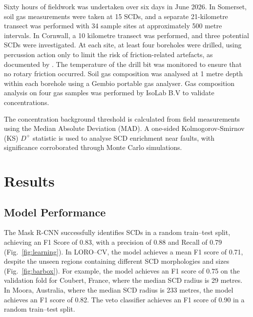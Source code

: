 \documentclass[12pt]{article}
\begin{document}
Sixty hours of fieldwork was undertaken over six days in June 2026. In Somerset, soil gas measurements were taken at 15 SCDs, and a separate 21-kilometre transect was performed with 34 sample sites at approximately 500 metre intervals. In Cornwall, a 10 kilometre transect was performed, and three potential SCDs were investigated. At each site, at least four boreholes were drilled, using percussion action only to limit the risk of friction-related  artefacts, as documented by \textcite{H2Artefacts}. The temperature of the drill bit was monitored to ensure that no rotary friction occurred. Soil gas composition was analysed at 1 metre depth within each borehole using a Gembio portable gas analyser. Gas composition analysis on four gas samples was performed by IsoLab B.V to validate  concentrations.

The  concentration background threshold is calculated from field measurements using the Median Absolute Deviation (MAD). A one-sided Kolmogorov-Smirnov (KS) $D^+$ statistic is used to analyse SCD enrichment near faults, with significance corroborated through Monte Carlo simulations. 

\section{Results}

\subsection{Model Performance}

The Mask R-CNN successfully identifies SCDs in a random train--test split, achieving an F1 Score of 0.83, with a precision of 0.88 and Recall of 0.79 (Fig.~\ref{fig:learning}). In LORO--CV, the model achieves a mean F1 score of 0.71, despite the unseen regions containing different SCD morphologies and sizes (Fig.~\ref{fig:barbox}). For example, the model achieves an F1 score of 0.75 on the validation fold for Coubert, France, where the median SCD radius is 29 metres. In Moora, Australia, where the median SCD radius is 233 metres, the model achieves an F1 score of 0.82. The veto classifier achieves an F1 score of 0.90 in a random train--test split. 
\end{document}
